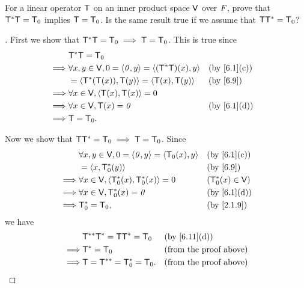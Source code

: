 \begin{ex}\label{ex:6.3.11}
  For a linear operator \(\mathsf{T}\) on an inner product space \(\mathsf{V}\) over \(\mathit{F}\), prove that \(\mathsf{T}^* \mathsf{T} = \mathsf{T}_0\) implies \(\mathsf{T} = \mathsf{T}_0\).
  Is the same result true if we assume that \(\mathsf{T} \mathsf{T}^* = \mathsf{T}_0\)?
\end{ex}

\begin{proof}[]
  First we show that \(\mathsf{T}^* \mathsf{T} = \mathsf{T}_0 \implies \mathsf{T} = \mathsf{T}_0\).
  This is true since
  \begin{align*}
             & \T^* \T = \zT                                                                                \\
    \implies & \forall x, y \in \V, 0 = \inn{\zv, y} = \inn{(\T^* \T)(x), y} &  & \text{(by \cref{6.1}(c))} \\
             & = \inn{\T^*(\T(x)), \T(y)} = \inn{\T(x), \T(y)}               &  & \text{(by \cref{6.9})}    \\
    \implies & \forall x \in \V, \inn{\T(x), \T(x)} = 0                                                     \\
    \implies & \forall x \in \V, \T(x) = \zv                                 &  & \text{(by \cref{6.1}(d))} \\
    \implies & \T = \zT.
  \end{align*}

  Now we show that \(\mathsf{T} \mathsf{T}^* = \mathsf{T}_0 \implies \mathsf{T} = \mathsf{T}_0\).
  Since
  \begin{align*}
             & \forall x, y \in \V, 0 = \inn{\zv, y} = \inn{\zT(x), y} &  & \text{(by \cref{6.1}(c))} \\
             & = \inn{x, \zT^*(y)}                                     &  & \text{(by \cref{6.9})}    \\
    \implies & \forall x \in \V, \inn{\zT^*(x), \zT^*(x)} = 0          &  & (\zT^*(x) \in \V)         \\
    \implies & \forall x \in \V, \zT^*(x) = \zv                        &  & \text{(by \cref{6.1}(d))} \\
    \implies & \zT^* = \zT,                                            &  & \text{(by \cref{2.1.9})}
  \end{align*}
  we have
  \begin{align*}
             & \T^{**} \T^* = \T \T^* = \zT &  & \text{(by \cref{6.11}(d))}    \\
    \implies & \T^* = \zT                   &  & \text{(from the proof above)} \\
    \implies & \T = \T^{**} = \zT^* = \zT.  &  & \text{(from the proof above)}
  \end{align*}
\end{proof}


